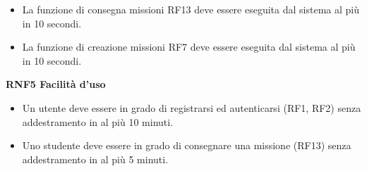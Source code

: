 \begin{itemize}
\item La funzione di consegna missioni RF13 deve essere eseguita dal sistema al più in 10 secondi.

\item La funzione di creazione missioni RF7 deve essere eseguita dal sistema al più in 10 secondi.
\end{itemize}

\textbf{RNF5 Facilità d'uso}

\begin{itemize}
  \item Un utente deve essere in grado di registrarsi ed autenticarsi (RF1, RF2) senza addestramento in al più 10 minuti.

  \item Uno studente deve essere in grado di consegnare una missione (RF13) senza addestramento in al più 5 minuti.
\end{itemize}

